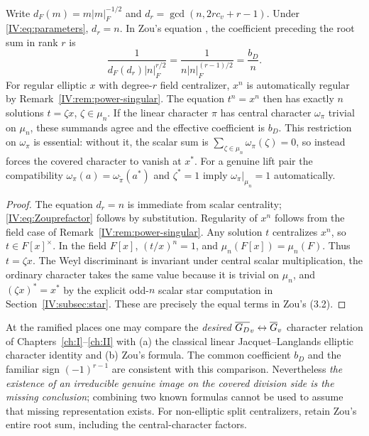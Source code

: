 \begin{proposition}\label{IV:prop:Zouconstant}
Write $d_F(m)=m|m|_F^{-1/2}$ and
$d_r=\gcd(n,2rc_v+r-1)$.  Under \eqref{IV:eq:parameters},
$d_r=n$.  In Zou's equation \cite[(3.2)]{Zo23}, the coefficient preceding
the root sum in rank $r$ is
\begin{equation}\label{IV:eq:Zouprefactor}
 \frac{1}{d_F(d_r)|n|_F^{r/2}}
 =\frac{1}{n|n|_F^{(r-1)/2}}=\frac{b_D}{n}.
\end{equation}
For regular elliptic $x$ with degree-$r$ field centralizer,
$x^n$ is automatically regular by Remark~\ref{IV:rem:power-singular}.
The equation $t^n=x^n$ then has exactly $n$ solutions
$t=\zeta x$, $\zeta\in\mu_n$.  If the linear character
$\pi$ has central character $\omega_\pi$ trivial on $\mu_n$,
these summands agree and the effective coefficient is $b_D$.
This restriction on $\omega_\pi$ is essential: without it, the
scalar sum is $\sum_{\zeta\in\mu_n}\omega_\pi(\zeta)=0$,
so \cite[(3.2)]{Zo23} instead forces the covered character to vanish
at $x^*$.  For a genuine lift pair the compatibility
$\omega_\pi(a)=\omega_{\widetilde\pi}(a^*)$
and $\zeta^*=1$ imply $\omega_\pi|_{\mu_n}=1$ automatically.
\end{proposition}
\begin{proof}
The equation $d_r=n$ is immediate from scalar centrality;
\eqref{IV:eq:Zouprefactor} follows by substitution.  Regularity of
$x^n$ follows from the field case of Remark~\ref{IV:rem:power-singular}.
Any solution $t$ centralizes $x^n$, so $t\in F[x]^\times$.  In the field $F[x]$, $(t/x)^n=1$,
and $\mu_n(F[x])=\mu_n(F)$.  Thus $t=\zeta x$.
The Weyl discriminant is invariant under central scalar
multiplication, the ordinary character takes the same value
because it is trivial on $\mu_n$, and $(\zeta x)^*=x^*$
by the explicit odd-$n$ scalar star computation in
Section~\ref{IV:subsec:star}.
These are precisely the equal terms in Zou's (3.2).
\end{proof}

\begin{remark}
At the ramified places one may compare the \emph{desired}
$\overline{G_D}_v\leftrightarrow\overline G_v$ character relation of Chapters~\ref{ch:I}--\ref{ch:II}
with (a) the classical linear Jacquet--Langlands elliptic
character identity and (b) Zou's formula.  The common coefficient
$b_D$ and the familiar sign $(-1)^{r-1}$ are consistent with
this comparison.  Nevertheless \emph{the existence of an
irreducible genuine image on the covered division side is the
missing conclusion}; combining two known formulas cannot be
used to assume that missing representation exists.
For non-elliptic split centralizers, retain Zou's entire
root sum, including the central-character factors.
\end{remark}

